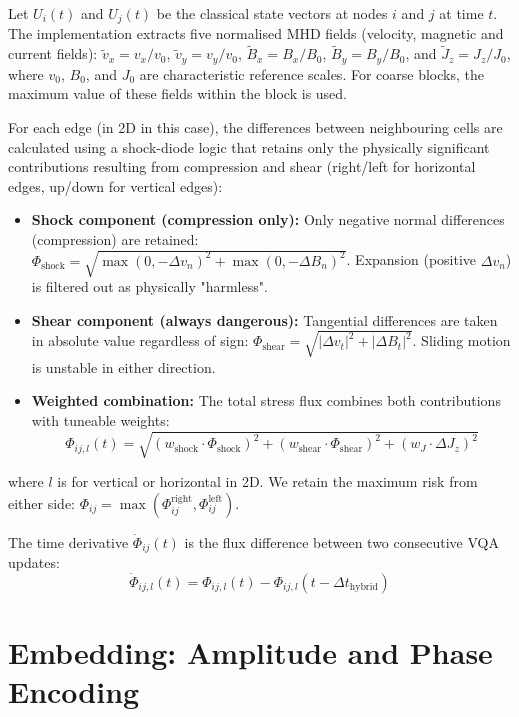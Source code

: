 \documentclass[12pt, a4paper, oneside]{report}
\begin{document}
Let $U_i(t)$ and $U_j(t)$ be the classical state vectors at nodes $i$ and $j$ at time $t$. The implementation extracts five normalised MHD fields (velocity, magnetic and current fields): $\tilde{v}_x = v_x / v_0$, $\tilde{v}_y = v_y / v_0$, $\tilde{B}_x = B_x / B_0$, $\tilde{B}_y = B_y / B_0$, and $\tilde{J}_z = J_z / J_0$, where $v_0$, $B_0$, and $J_0$ are characteristic reference scales. For coarse blocks, the maximum value of these fields within the block is used.

For each edge (in 2D in this case), the differences between neighbouring cells are calculated using a shock-diode logic that retains only the physically significant contributions resulting from compression and shear (right/left for horizontal edges, up/down for vertical edges):

\begin{itemize}
    \item \textbf{Shock component (compression only):} Only negative normal differences (compression) are retained: $\Phi_{\text{shock}} = \sqrt{\max(0, -\Delta v_n)^2 + \max(0, -\Delta B_n)^2}$. Expansion (positive $\Delta v_n$) is filtered out as physically "harmless".
    \item \textbf{Shear component (always dangerous):} Tangential differences are taken in absolute value regardless of sign: $\Phi_{\text{shear}} = \sqrt{|\Delta v_t|^2 + |\Delta B_t|^2}$. Sliding motion is unstable in either direction.
    \item \textbf{Weighted combination:} The total stress flux combines both contributions with tuneable weights:
    \begin{equation}
        \Phi_{ij,l}(t) = \sqrt{(w_{\text{shock}} \cdot \Phi_{\text{shock}})^2 + (w_{\text{shear}} \cdot \Phi_{\text{shear}})^2 + (w_J \cdot \Delta J_z)^2}
    \end{equation}
\end{itemize}
\noindent where $l$ is for vertical or horizontal in 2D.
We retain the maximum risk from either side: $\Phi_{ij} = \max(\Phi_{ij}^{\text{right}}, \Phi_{ij}^{\text{left}})$.

The time derivative $\dot{\Phi}_{ij}(t)$ is the flux difference between two consecutive VQA updates:
\begin{equation}
    \dot{\Phi}_{ij, l}(t) = \Phi_{ij, l}(t) - \Phi_{ij, l}(t - \Delta t_{\text{hybrid}})
\end{equation}

\section{Embedding: Amplitude and Phase Encoding}
\label{sec:dense-embedding}
\end{document}
